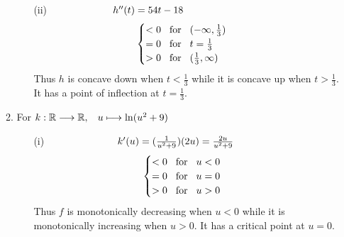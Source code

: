 \documentclass[12pt]{amsart}
\begin{document}
\begin{enumerate}
\begin{enumerate}
\begin{enumerate}
					\item[(ii)] $\text{ } \hspace{2.1cm} h''(t) = 54t-18$
						\begin{align}
							\begin{cases}
								< 0 \hspace{0.3cm} \text{for} \hspace{0.3cm} (-\infty,\frac{1}{3}) 									\notag \\
								= 0 \hspace{0.3cm} \text{for} \hspace{0.3cm} t=\frac{1}{3} \notag \\
								> 0 \hspace{0.3cm} \text{for} \hspace{0.3cm} (\frac{1}{3},\infty) \notag
							\end{cases}
						\end{align} 
					Thus $h$ is concave down when $t<\frac{1}{3}$ while it is concave up when 
					$t>\frac{1}{3}$.	It has a point of inflection at $t=\frac{1}{3}$. \\
				
				\end{enumerate}

			\item For $k: \mathbb{R} \longrightarrow \mathbb{R}, \hspace{0.3cm} u \longmapsto 
			\ln(u^2+9)$
			
				\begin{enumerate}
					\item[(i)] $\text{ } \hspace{2.35cm} k'(u) = (\frac{1}{u^2+9})(2u) = \frac{2u}{u^2+9}$								 
						\begin{align}
							\begin{cases}
								< 0 \hspace{0.3cm} \text{for} \hspace{0.3cm} u<0 \notag \\
								= 0 \hspace{0.3cm} \text{for} \hspace{0.3cm} u=0 \notag \\
								> 0 \hspace{0.3cm} \text{for} \hspace{0.3cm} u>0 \notag
							\end{cases}
						\end{align} 
						Thus $f$ is monotonically decreasing when $u<0$ while it is monotonically 							increasing when $u>0$. It has a critical point at $u=0$. \\
										

\end{enumerate}
\end{enumerate}
\end{enumerate}
\end{document}
